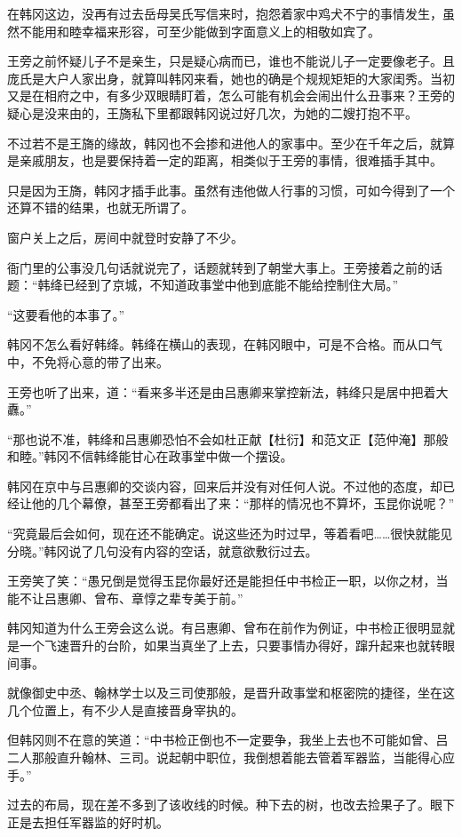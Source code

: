 在韩冈这边，没再有过去岳母吴氏写信来时，抱怨着家中鸡犬不宁的事情发生，虽然不能用和睦幸福来形容，可至少能做到字面意义上的相敬如宾了。

王旁之前怀疑儿子不是亲生，只是疑心病而已，谁也不能说儿子一定要像老子。且庞氏是大户人家出身，就算叫韩冈来看，她也的确是个规规矩矩的大家闺秀。当初又是在相府之中，有多少双眼睛盯着，怎么可能有机会会闹出什么丑事来？王旁的疑心是没来由的，王旖私下里都跟韩冈说过好几次，为她的二嫂打抱不平。

不过若不是王旖的缘故，韩冈也不会掺和进他人的家事中。至少在千年之后，就算是亲戚朋友，也是要保持着一定的距离，相类似于王旁的事情，很难插手其中。

只是因为王旖，韩冈才插手此事。虽然有违他做人行事的习惯，可如今得到了一个还算不错的结果，也就无所谓了。

窗户关上之后，房间中就登时安静了不少。

衙门里的公事没几句话就说完了，话题就转到了朝堂大事上。王旁接着之前的话题：“韩绛已经到了京城，不知道政事堂中他到底能不能给控制住大局。”

“这要看他的本事了。”

韩冈不怎么看好韩绛。韩绛在横山的表现，在韩冈眼中，可是不合格。而从口气中，不免将心意的带了出来。

王旁也听了出来，道：“看来多半还是由吕惠卿来掌控新法，韩绛只是居中把着大纛。”

“那也说不准，韩绛和吕惠卿恐怕不会如杜正献【杜衍】和范文正【范仲淹】那般和睦。”韩冈不信韩绛能甘心在政事堂中做一个摆设。

韩冈在京中与吕惠卿的交谈内容，回来后并没有对任何人说。不过他的态度，却已经让他的几个幕僚，甚至王旁都看出了来：“那样的情况也不算坏，玉昆你说呢？”

“究竟最后会如何，现在还不能确定。说这些还为时过早，等着看吧……很快就能见分晓。”韩冈说了几句没有内容的空话，就意欲敷衍过去。

王旁笑了笑：“愚兄倒是觉得玉昆你最好还是能担任中书检正一职，以你之材，当能不让吕惠卿、曾布、章惇之辈专美于前。”

韩冈知道为什么王旁会这么说。有吕惠卿、曾布在前作为例证，中书检正很明显就是一个飞速晋升的台阶，如果当真坐了上去，只要事情办得好，蹿升起来也就转眼间事。

就像御史中丞、翰林学士以及三司使那般，是晋升政事堂和枢密院的捷径，坐在这几个位置上，有不少人是直接晋身宰执的。

但韩冈则不在意的笑道：“中书检正倒也不一定要争，我坐上去也不可能如曾、吕二人那般直升翰林、三司。说起朝中职位，我倒想着能去管着军器监，当能得心应手。”

过去的布局，现在差不多到了该收线的时候。种下去的树，也改去捡果子了。眼下正是去担任军器监的好时机。

